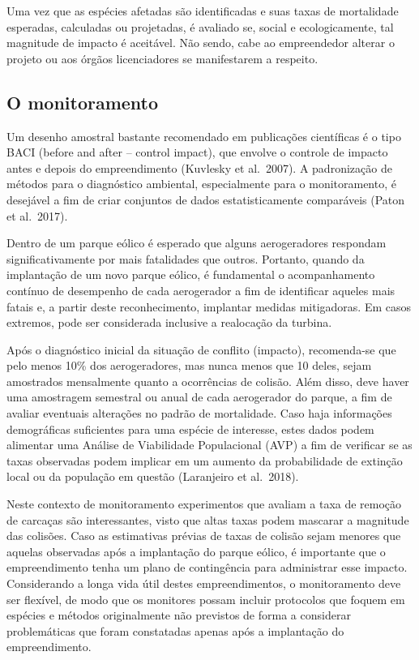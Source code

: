 \documentclass[
  oneside]{scrbook}
\begin{document}
Uma vez que as espécies afetadas são identificadas e suas taxas de mortalidade esperadas, calculadas ou projetadas, é avaliado se, social e ecologicamente, tal magnitude de impacto é aceitável. Não sendo, cabe ao empreendedor alterar o projeto ou aos órgãos licenciadores se manifestarem a respeito.

\hypertarget{monitoramento}{%
\subsection{O monitoramento}\label{monitoramento}}

Um desenho amostral bastante recomendado em publicações científicas é o tipo BACI (before and after -- control impact), que envolve o controle de impacto antes e depois do empreendimento (Kuvlesky et al.~2007). A padronização de métodos para o diagnóstico ambiental, especialmente para o monitoramento, é desejável a fim de criar conjuntos de dados estatisticamente comparáveis (Paton et al.~2017).

Dentro de um parque eólico é esperado que alguns aerogeradores respondam significativamente por mais fatalidades que outros. Portanto, quando da implantação de um novo parque eólico, é fundamental o acompanhamento contínuo de desempenho de cada aerogerador a fim de identificar aqueles mais fatais e, a partir deste reconhecimento, implantar medidas mitigadoras. Em casos extremos, pode ser considerada inclusive a realocação da turbina.

Após o diagnóstico inicial da situação de conflito (impacto), recomenda-se que pelo menos 10\% dos aerogeradores, mas nunca menos que 10 deles, sejam amostrados mensalmente quanto a ocorrências de colisão. Além disso, deve haver uma amostragem semestral ou anual de cada aerogerador do parque, a fim de avaliar eventuais alterações no padrão de mortalidade. Caso haja informações demográficas suficientes para uma espécie de interesse, estes dados podem alimentar uma Análise de Viabilidade Populacional (AVP) a fim de verificar se as taxas observadas podem implicar em um aumento da probabilidade de extinção local ou da população em questão (Laranjeiro et al.~2018).

Neste contexto de monitoramento experimentos que avaliam a taxa de remoção de carcaças são interessantes, visto que altas taxas podem mascarar a magnitude das colisões. Caso as estimativas prévias de taxas de colisão sejam menores que aquelas observadas após a implantação do parque eólico, é importante que o empreendimento tenha um plano de contingência para administrar esse impacto. Considerando a longa vida útil destes empreendimentos, o monitoramento deve ser flexível, de modo que os monitores possam incluir protocolos que foquem em espécies e métodos originalmente não previstos de forma a considerar problemáticas que foram constatadas apenas após a implantação do empreendimento.
\end{document}
